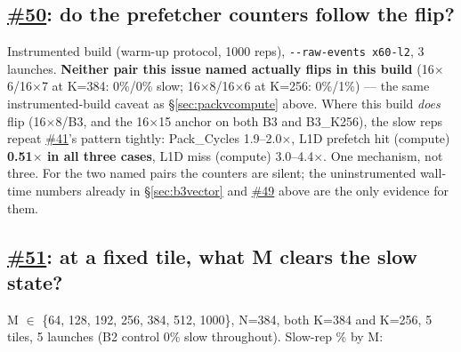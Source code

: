 \documentclass[10pt,a4paper]{article}
\newcommand{\iss}[1]{\href{https://github.com/JieGH/RVV_code_gen_via_MLIR_xDSL/issues/#1}{\##1}}
\begin{document}
\subsection*{\iss{50}: do the prefetcher counters follow the flip?}
Instrumented build (warm-up protocol, 1000 reps), \texttt{-{}-raw-events x60-l2}, 3 launches. \textbf{Neither pair this
issue named actually flips in this build} (16$\times$6/16$\times$7 at K=384: 0\%/0\% slow; 16$\times$8/16$\times$6 at
K=256: 0\%/1\%) --- the same instrumented-build caveat as \S\ref{sec:packvcompute} above. Where this build \emph{does}
flip (16$\times$8/B3, and the 16$\times$15 anchor on both B3 and B3\_K256), the slow reps repeat \iss{41}'s pattern
tightly: Pack\_Cycles 1.9--2.0$\times$, L1D prefetch hit (compute) \textbf{0.51$\times$ in all three cases}, L1D miss
(compute) 3.0--4.4$\times$. One mechanism, not three. For the two named pairs the counters are silent; the
uninstrumented wall-time numbers already in \S\ref{sec:b3vector} and \iss{49} above are the only evidence for them.

\subsection*{\iss{51}: at a fixed tile, what M clears the slow state?}
M $\in$ \{64, 128, 192, 256, 384, 512, 1000\}, N=384, both K=384 and K=256, 5 tiles, 5 launches (B2 control 0\% slow
throughout). Slow-rep \% by M:
\end{document}
